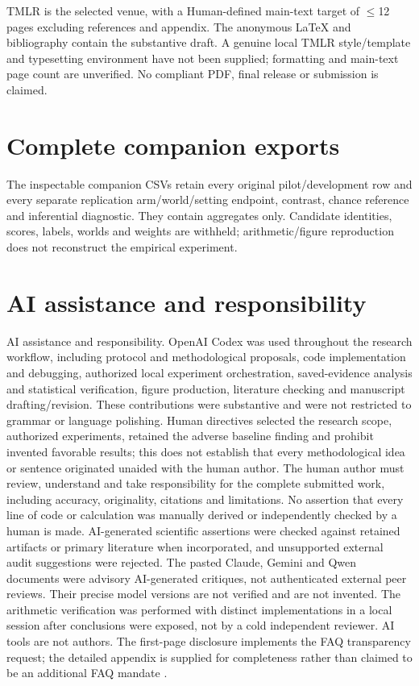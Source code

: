 \documentclass{article}
\begin{document}
TMLR is the selected venue, with a Human-defined main-text target of \(\leq\)12 pages excluding references and appendix. The anonymous LaTeX and bibliography contain the substantive draft. A genuine local TMLR style/template and typesetting environment have not been supplied; formatting and main-text page count are unverified. No compliant PDF, final release or submission is claimed.

\nocite{AMLSIM_LICENSE,AP_DOC}


\appendix
\section{Complete companion exports}
The inspectable companion CSVs retain every original pilot/development row and every separate replication arm/world/setting endpoint, contrast, chance reference and inferential diagnostic. They contain aggregates only. Candidate identities, scores, labels, worlds and weights are withheld; arithmetic/figure reproduction does not reconstruct the empirical experiment.
\section{AI assistance and responsibility}
AI assistance and responsibility. OpenAI Codex was used throughout the research workflow, including protocol and methodological proposals, code implementation and debugging, authorized local experiment orchestration, saved-evidence analysis and statistical verification, figure production, literature checking and manuscript drafting/revision. These contributions were substantive and were not restricted to grammar or language polishing. Human directives selected the research scope, authorized experiments, retained the adverse baseline finding and prohibit invented favorable results; this does not establish that every methodological idea or sentence originated unaided with the human author. The human author must review, understand and take responsibility for the complete submitted work, including accuracy, originality, citations and limitations. No assertion that every line of code or calculation was manually derived or independently checked by a human is made. AI-generated scientific assertions were checked against retained artifacts or primary literature when incorporated, and unsupported external audit suggestions were rejected. The pasted Claude, Gemini and Qwen documents were advisory AI-generated critiques, not authenticated external peer reviews. Their precise model versions are not verified and are not invented. The arithmetic verification was performed with distinct implementations in a local session after conclusions were exposed, not by a cold independent reviewer. AI tools are not authors. The first-page disclosure implements the FAQ transparency request; the detailed appendix is supplied for completeness rather than claimed to be an additional FAQ mandate \citep{TMLR_FAQ} \citep{TMLR_POLICY}.
\end{document}
